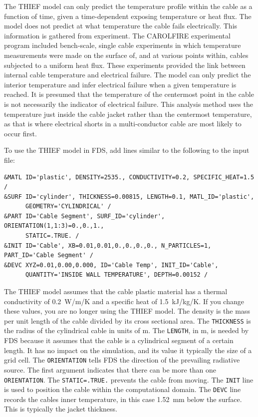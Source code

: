 \documentclass[11pt]{book}
\newcommand{\ct}{\tt\small}
\begin{document}
The THIEF model can only predict the temperature profile within the cable as a function of time,
given a time-dependent exposing temperature or heat flux. The model does not predict at what
temperature the cable fails electrically. This information is gathered from experiment. The
CAROLFIRE experimental program included bench-scale, single cable experiments in which
temperature measurements were made on the surface of, and at various points within, cables
subjected to a uniform heat flux. These experiments provided the link between internal cable
temperature and electrical failure. The model can only predict the interior temperature and infer
electrical failure when a given temperature is reached. It is presumed that the
temperature of the centermost point in the cable is not necessarily the indicator of electrical
failure. This analysis method uses the temperature just inside the cable jacket rather than the
centermost temperature, as that is where electrical shorts in a multi-conductor cable are most
likely to occur first.

To use the THIEF model in FDS, add lines similar to the following to the input file:

\footnotesize
\begin{verbatim}
&MATL ID='plastic', DENSITY=2535., CONDUCTIVITY=0.2, SPECIFIC_HEAT=1.5 /
&SURF ID='cylinder', THICKNESS=0.00815, LENGTH=0.1, MATL_ID='plastic',
      GEOMETRY='CYLINDRICAL' /
&PART ID='Cable Segment', SURF_ID='cylinder', ORIENTATION(1,1:3)=0.,0.,1.,
      STATIC=.TRUE. /
&INIT ID='Cable', XB=0.01,0.01,0.,0.,0.,0., N_PARTICLES=1, PART_ID='Cable Segment' /
&DEVC XYZ=0.01,0.00,0.000, ID='Cable Temp', INIT_ID='Cable',
      QUANTITY='INSIDE WALL TEMPERATURE', DEPTH=0.00152 /
\end{verbatim}
\normalsize

\noindent
The THIEF model assumes that the cable plastic material has a thermal conductivity of 0.2~W/m/K and a specific heat of 1.5~kJ/kg/K. If you change these
values, you are no longer using the THIEF model. The density is the mass per unit length of the cable divided by its cross sectional area.
The {\ct THICKNESS} is the radius of the cylindrical cable in units of m. The {\ct LENGTH}, in m, is needed
by FDS because it assumes that the cable is a cylindrical segment of a certain length. It has no impact on the simulation, and its value it typically the size of a grid cell.
The {\ct ORIENTATION} tells FDS the direction of the prevailing radiative source. The first argument indicates that there can be more than one {\ct ORIENTATION}.
The {\ct STATIC=.TRUE.} prevents the cable from moving. The {\ct INIT} line is used to position the cable within the computational domain.
The {\ct DEVC} line records the cables inner temperature, in this case 1.52~mm below the surface. This is typically the jacket thickness.
\end{document}
